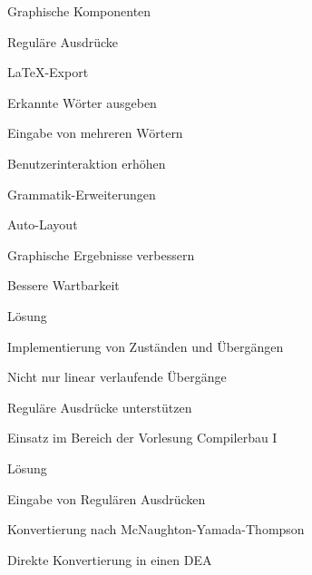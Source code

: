 



{
    \begin{itemgroup}{}
	\item Graphische Komponenten
	\item Reguläre Ausdrücke
	\item \LaTeX-Export
	\item Erkannte Wörter ausgeben
	\item Eingabe von mehreren Wörtern
	\item Benutzerinteraktion erhöhen
	\item Grammatik-Erweiterungen
	\item Auto-Layout
	\end{itemgroup}

    \vfill{}
}


{
    \begin{itemgroup}{}
	\item Graphische Ergebnisse verbessern
	\item Bessere Wartbarkeit
    \end{itemgroup}

    \begin{itemgroup}{Lösung}
	\item Implementierung von Zuständen und Übergängen
	\item Nicht nur linear verlaufende Übergänge
	\end{itemgroup}
    
    \vfill{}
}


{
    \begin{itemgroup}{}
	\item Reguläre Ausdrücke unterstützen
	\item Einsatz im Bereich der Vorlesung Compilerbau I
    \end{itemgroup}

    \begin{itemgroup}{Lösung}
	\item Eingabe von Regulären Ausdrücken
	\item Konvertierung nach McNaughton-Yamada-Thompson
	\item Direkte Konvertierung in einen DEA
	\end{itemgroup}
    
    \vfill{}
}


